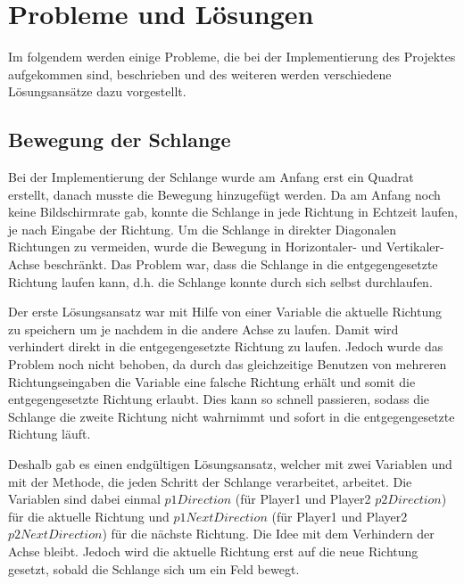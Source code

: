
\chapter{Probleme und L{\"o}sungen}
\label{Probleme_und_Loesungen}
%
Im folgendem werden einige Probleme, die bei der Implementierung des Projektes aufgekommen sind, beschrieben und des weiteren werden verschiedene L{\"o}sungsans{\"a}tze dazu vorgestellt.

\section{Bewegung der Schlange}
\label{Bewegung der Schlange}
%
Bei der Implementierung der Schlange wurde am Anfang erst ein Quadrat erstellt, danach musste die Bewegung hinzugef{\"u}gt werden. Da am Anfang noch keine Bildschirmrate gab, konnte die Schlange in jede Richtung in Echtzeit laufen, je nach Eingabe der Richtung. Um die Schlange in direkter Diagonalen Richtungen zu vermeiden, wurde die Bewegung in Horizontaler- und Vertikaler-Achse beschr{\"a}nkt. Das Problem war, dass die Schlange in die entgegengesetzte Richtung laufen kann, d.h. die Schlange konnte durch sich selbst durchlaufen.

Der erste L{\"o}sungsansatz war mit Hilfe von einer Variable die aktuelle Richtung zu speichern um je nachdem in die andere Achse zu laufen. Damit wird verhindert direkt in die entgegengesetzte Richtung zu laufen. Jedoch wurde das Problem noch nicht behoben, da durch das gleichzeitige Benutzen von mehreren Richtungseingaben die Variable eine falsche Richtung erh{\"a}lt und somit die entgegengesetzte Richtung erlaubt. Dies kann so schnell passieren, sodass die Schlange die zweite Richtung nicht wahrnimmt und sofort in die entgegengesetzte Richtung l{\"a}uft.

Deshalb gab es einen endg{\"u}ltigen L{\"o}sungsansatz, welcher mit zwei Variablen und mit der Methode, die jeden Schritt der Schlange verarbeitet, arbeitet. Die Variablen sind dabei einmal $p1Direction$ (f{\"u}r Player1 und Player2 $p2Direction$) f{\"u}r die aktuelle Richtung und $p1NextDirection$ (f{\"u}r Player1 und Player2 $p2NextDirection$) f{\"u}r die n{\"a}chste Richtung. Die Idee mit dem Verhindern der Achse bleibt. Jedoch wird die aktuelle Richtung erst auf die neue Richtung gesetzt, sobald die Schlange sich um ein Feld bewegt. 
%
